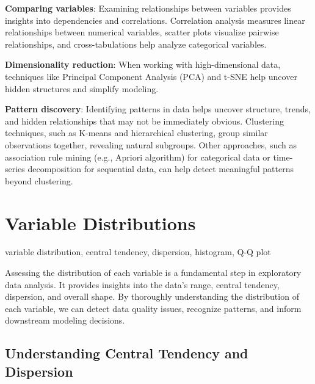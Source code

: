 \documentclass[12pt,openany]{book}
\begin{document}
\textbf{Comparing variables}: Examining relationships between variables provides insights into dependencies and correlations. Correlation analysis measures linear relationships between numerical variables, scatter plots visualize pairwise relationships, and cross-tabulations help analyze categorical variables.
\newline

\textbf{Dimensionality reduction}: When working with high-dimensional data, techniques like Principal Component Analysis (PCA) and t-SNE help uncover hidden structures and simplify modeling.
\newline

\textbf{Pattern discovery}: Identifying patterns in data helps uncover structure, trends, and hidden relationships that may not be immediately obvious. Clustering techniques, such as K-means and hierarchical clustering, group similar observations together, revealing natural subgroups. Other approaches, such as association rule mining (e.g., Apriori algorithm) for categorical data or time-series decomposition for sequential data, can help detect meaningful patterns beyond clustering.
\newline



\section{Variable Distributions}

\begin{keywordsbox}
variable distribution, central tendency, dispersion, histogram, Q-Q plot
\end{keywordsbox}

Assessing the distribution of each variable is a fundamental step in exploratory data analysis. It provides insights into the data's range, central tendency, dispersion, and overall shape. By thoroughly understanding the distribution of each variable, we can detect data quality issues, recognize patterns, and inform downstream modeling decisions.


\subsection{Understanding Central Tendency and Dispersion}
\end{document}

